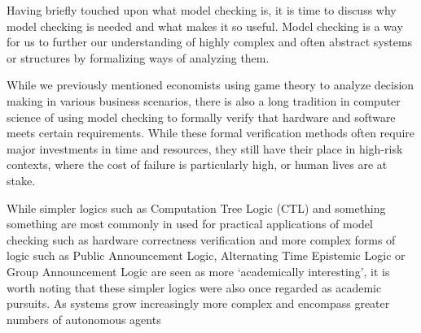 Having briefly touched upon what model checking is, it is time to discuss why model checking is needed and what makes it so useful. 
Model checking is a way for us to further our understanding of highly complex and often abstract systems or structures by formalizing ways of analyzing them. 

While we previously mentioned economists using game theory to analyze decision making in various business scenarios, there is also a long tradition in computer science of using model checking to formally verify that hardware and software meets certain requirements. While these formal verification methods often require major investments in time and resources, they still have their place in high-risk contexts, where the cost of failure is particularly high, or human lives are at stake. 



While simpler logics such as Computation Tree Logic (CTL) and something something are most commonly in used for practical applications of model checking such as hardware correctness verification and more complex forms of logic such as Public Announcement Logic, Alternating Time Epistemic Logic or Group Announcement Logic are seen as more `academically interesting', it is worth noting that these simpler logics were also once regarded as academic pursuits. As systems grow increasingly more complex and encompass greater numbers of autonomous agents 

